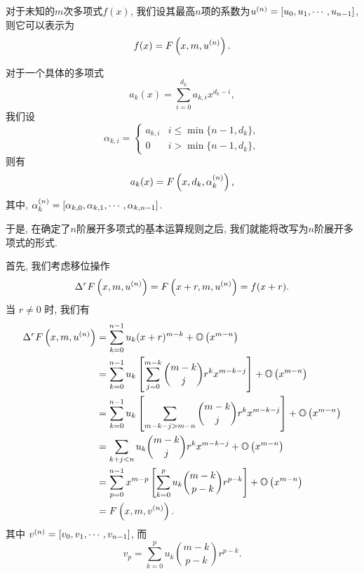 对于未知的$m$次多项式$f(x)$, 我们设其最高$n$项的系数为$u^{(n)}=\left[u_0,u_1,\cdots,u_{n-1}\right]$, 则它可以表示为 
\begin{equation}
f(x)=F\left(x,m,u^{(n)}\right).
\end{equation}

对于一个具体的多项式
\begin{equation}
a_k(x)=\sum_{i=0}^{d_k}{a_{k,i} x^{d_k-i}},
\end{equation}
我们设
\begin{equation}
\alpha_{k,i}=\left\{
\begin{array}{cl}
a_{k,i} & i\le \min\{n-1,d_k\}, \\
0       & i >  \min\{n-1,d_k\},
\end{array}
\right.
\end{equation}
则有
\begin{equation}
a_k(x)=F\left(x,d_k,\alpha_k^{(n)}\right),
\end{equation}
其中, $\alpha_k^{(n)}=\left[\alpha_{k,0},\alpha_{k,1},\cdots,\alpha_{k,n-1}\right]$.

于是, 在确定了$n$阶展开多项式的基本运算规则之后, 我们就能将改写为$n$阶展开多项式的形式.

首先, 我们考虑移位操作
\begin{equation}
\Delta^r F\left(x,m,u^{(n)}\right) = F\left(x+r,m,u^{(n)}\right) = f(x+r).
\end{equation}
当 $r\neq 0$ 时, 我们有 
\begin{equation}
\begin{split}
\Delta^r F\left(x,m,u^{(n)}\right) &= \sum_{k=0}^{n-1}{u_k (x+r)^{m-k}}+\mathbb O\left(x^{m-n}\right) \\
&= \sum_{k=0}^{n-1}{u_k \left[\sum_{j=0}^{m-k}{\binom{m-k}{j}r^kx^{m-k-j}}\right]}+\mathbb O\left(x^{m-n}\right) \\
&= \sum_{k=0}^{n-1}{u_k \left[\sum_{m-k-j>m-n}{\binom{m-k}{j}r^kx^{m-k-j}}\right]}+\mathbb O\left(x^{m-n}\right) \\
&= \sum_{k+j<n}{u_k {\binom{m-k}{j}r^kx^{m-k-j}}}+\mathbb O\left(x^{m-n}\right) \\
&=\sum_{p=0}^{n-1}{x^{m-p}\left[\sum_{k=0}^p{u_k\binom{m-k}{p-k}r^{p-k}}\right]}+\mathbb O\left(x^{m-n}\right)\\
&=F\left(x,m,v^{(n)}\right).
\end{split}
\end{equation}
其中 $v^{(n)}=\left[v_0,v_1,\cdots,v_{n-1}\right]$, 而
\begin{equation}
v_p=\sum_{k=0}^p{u_k\binom{m-k}{p-k}r^{p-k}}.
\end{equation}

